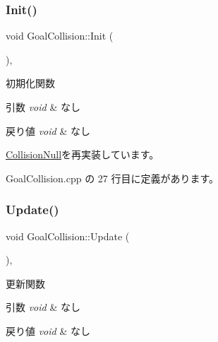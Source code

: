 \subsubsection{\texorpdfstring{Init()}{Init()}}
{\footnotesize\ttfamily void Goal\+Collision\+::\+Init (\begin{DoxyParamCaption}{ }\end{DoxyParamCaption})\hspace{0.3cm}{\ttfamily [override]}, {\ttfamily [virtual]}}



初期化関数 


\begin{DoxyParams}{引数}
{\em void} & なし \\
\hline
\end{DoxyParams}

\begin{DoxyRetVals}{戻り値}
{\em void} & なし \\
\hline
\end{DoxyRetVals}


\mbox{\hyperlink{class_collision_null_a18cfc21fefcd3e8dec380ac44a85f111}{Collision\+Null}}を再実装しています。



 Goal\+Collision.\+cpp の 27 行目に定義があります。

\mbox{\label{class_goal_collision_a1e3995dc2f5ba2678580d06699ca6936}} 
\subsubsection{\texorpdfstring{Update()}{Update()}}
{\footnotesize\ttfamily void Goal\+Collision\+::\+Update (\begin{DoxyParamCaption}{ }\end{DoxyParamCaption})\hspace{0.3cm}{\ttfamily [override]}, {\ttfamily [virtual]}}



更新関数 


\begin{DoxyParams}{引数}
{\em void} & なし \\
\hline
\end{DoxyParams}

\begin{DoxyRetVals}{戻り値}
{\em void} & なし \\
\hline
\end{DoxyRetVals}


